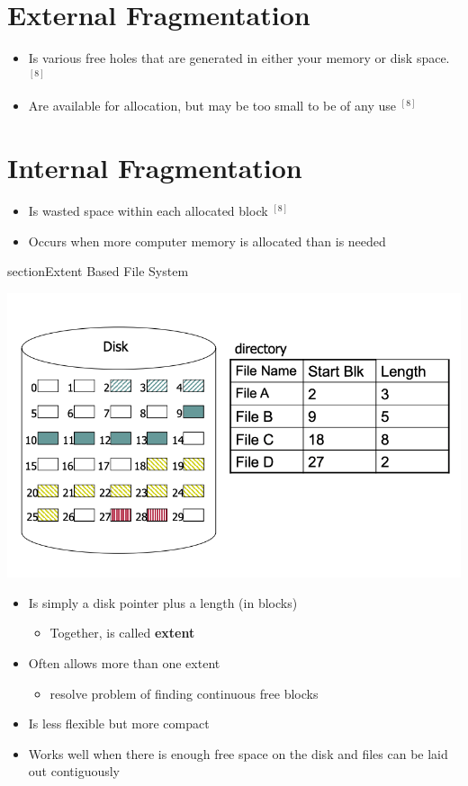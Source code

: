 \documentclass[12pt]{article}
\begin{document}
\section{External Fragmentation}

\begin{itemize}
    \item Is various free holes that are generated in either your
    memory or disk space. $^{[8]}$
    \item Are available for allocation, but may be too small to be of
    any use $^{[8]}$
\end{itemize}

\section{Internal Fragmentation}

\begin{itemize}
    \item Is wasted space within each allocated block $^{[8]}$
    \item Occurs when more computer memory is allocated than is needed
\end{itemize}

\*section{Extent Based File System}

\begin{center}
\includegraphics[width=\linewidth]{../images/midterm_2_solution_32.png}
\end{center}

\begin{itemize}
    \item Is simply a disk pointer plus a length (in blocks)
    \begin{itemize}
        \item Together, is called \textbf{extent}
    \end{itemize}
    \item Often allows more than one extent
    \begin{itemize}
        \item resolve problem of finding continuous free blocks
    \end{itemize}
    \item Is less flexible but more compact
    \item Works well when there is enough free space on the disk and
    files can be laid out contiguously
\end{itemize}
\end{document}
